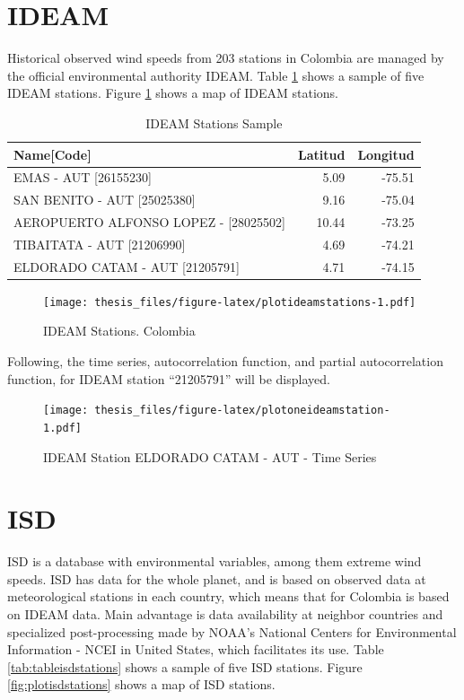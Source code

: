 \documentclass[12pt,oneside]{reedthesis}
\begin{document}
\hypertarget{ideam}{%
\section{IDEAM}\label{ideam}}

Historical observed wind speeds from 203 stations in Colombia are managed by the official environmental authority IDEAM. Table \ref{tab:tableideamstations} shows a sample of five IDEAM stations. Figure \ref{fig:plotideamstations} shows a map of IDEAM stations.

\begingroup\fontsize{10}{12}\selectfont
\begin{longtable}[t]{lrr}
\caption[IDEAM Stations Sample]{\label{tab:tableideamstations}IDEAM Stations Sample}\\
\toprule
Name[Code] & Latitud & Longitud\\
\midrule
EMAS - AUT [26155230] & 5.09 & -75.51\\
SAN BENITO - AUT [25025380] & 9.16 & -75.04\\
AEROPUERTO ALFONSO LOPEZ - [28025502] & 10.44 & -73.25\\
TIBAITATA - AUT [21206990] & 4.69 & -74.21\\
ELDORADO CATAM - AUT [21205791] & 4.71 & -74.15\\
\bottomrule
\end{longtable}
\endgroup{}
\begin{figure}
\centering
\texttt{[image: thesis\_files/figure-latex/plotideamstations-1.pdf]}
\caption{\label{fig:plotideamstations}IDEAM Stations. Colombia}
\end{figure}
Following, the time series, autocorrelation function, and partial autocorrelation function, for IDEAM station ``21205791'' will be displayed.
\begin{figure}
\centering
\texttt{[image: thesis\_files/figure-latex/plotoneideamstation-1.pdf]}
\caption{\label{fig:plotoneideamstation}IDEAM Station ELDORADO CATAM - AUT - Time Series}
\end{figure}
\hypertarget{isd}{%
\section{ISD}\label{isd}}

ISD is a database with environmental variables, among them extreme wind speeds. ISD has data for the whole planet, and is based on observed data at meteorological stations in each country, which means that for Colombia is based on IDEAM data. Main advantage is data availability at neighbor countries and specialized post-processing made by NOAA's National Centers for Environmental Information - NCEI in United States, which facilitates its use. Table \ref{tab:tableisdstations} shows a sample of five ISD stations. Figure \ref{fig:plotisdstations} shows a map of ISD stations.
\end{document}
